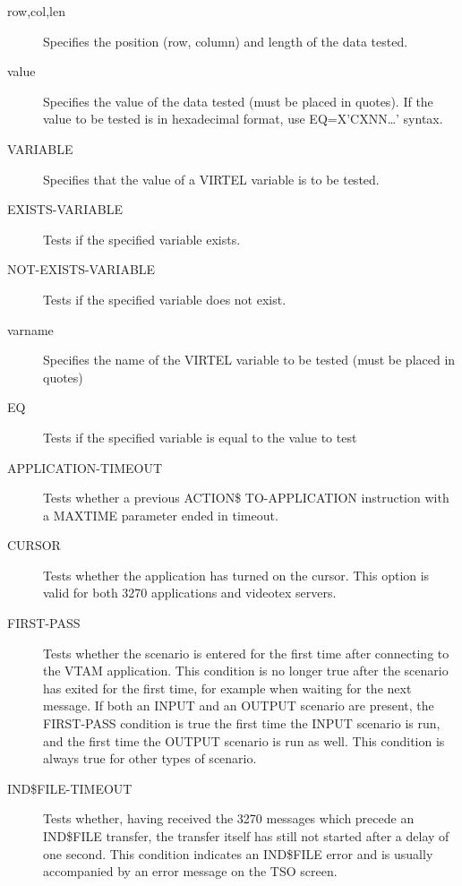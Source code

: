 \documentclass[letterpaper,10pt,english]{sphinxmanual}
\begin{document}
\begin{description}
\item[{row,col,len}] \leavevmode
Specifies the position (row, column) and length of the data tested.

\item[{value}] \leavevmode
Specifies the value of the data tested (must be placed in quotes). If the value to be tested is in hexadecimal format, use EQ=X’CXNN…’ syntax.

\item[{VARIABLE}] \leavevmode
Specifies that the value of a VIRTEL variable is to be tested.

\item[{EXISTS-VARIABLE}] \leavevmode
Tests if the specified variable exists.

\item[{NOT-EXISTS-VARIABLE}] \leavevmode
Tests if the specified variable does not exist.

\item[{varname}] \leavevmode
Specifies the name of the VIRTEL variable to be tested (must be placed in quotes)

\item[{EQ}] \leavevmode
Tests if the specified variable is equal to the value to test

\item[{APPLICATION-TIMEOUT}] \leavevmode
Tests whether a previous ACTION\$ TO-APPLICATION instruction with a MAXTIME parameter ended in timeout.

\item[{CURSOR}] \leavevmode
Tests whether the application has turned on the cursor. This option is valid for both 3270 applications and videotex servers.

\item[{FIRST-PASS}] \leavevmode
Tests whether the scenario is entered for the first time after connecting to the VTAM application. This condition is no longer true after the scenario has exited for the first time, for example when waiting for the next message. If both an INPUT and an OUTPUT scenario are present, the FIRST-PASS condition is true the first time the INPUT scenario is run, and the first time the OUTPUT scenario is run as well. This condition is always true for other types of scenario.

\item[{IND\$FILE-TIMEOUT}] \leavevmode
Tests whether, having received the 3270 messages which precede an IND\$FILE transfer, the transfer itself has still not started after a delay of one second. This condition indicates an IND\$FILE error and is usually accompanied by an error message on the TSO screen.


\end{description}
\end{document}

